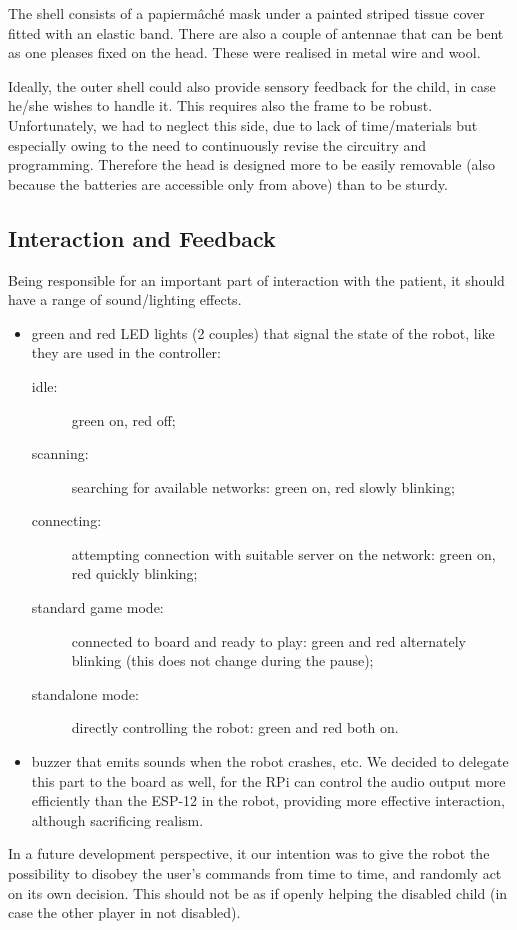 \documentclass[a4paper,twoside]{book}
\begin{document}
The shell consists of a papier\textendash m\^{a}ch\'{e} mask under a painted striped tissue cover fitted with an elastic band. There are also a couple of antennae that can be bent as one pleases fixed on the head. These were realised in metal wire and wool.

Ideally, the outer shell could also provide sensory feedback for the child, in case he/she wishes to handle it.
This requires also the frame to be robust. Unfortunately, we had to neglect this side, due to lack of time/materials but especially owing to the need to continuously revise the circuitry and programming. Therefore the head is designed more to be easily removable (also because the batteries are accessible only from above) than to be sturdy.

\subsection{Interaction and Feedback}

\beforelist* Being responsible for an important part of interaction with the patient, it should have a range of sound/lighting effects.
\begin{itemize}
\item green and red LED lights (2 couples) that signal the state of the robot, like they are used in the controller:
  \begin{description}
  \item[idle:] green on, red off;
  \item[scanning:] searching for available networks: green on, red slowly blinking;
  \item[connecting:] attempting connection with suitable server on the network: green on, red quickly blinking;
  \item[standard game mode:] connected to board and ready to play: green and red alternately blinking (this does not change during the pause);
  \item[standalone mode:] directly controlling the robot: green and red both on.
  \end{description}
\item buzzer that emits sounds when the robot crashes, etc. We decided to delegate this part to the board as well, for the RPi can control the audio output more efficiently than the ESP-12 in the robot, providing more effective interaction, although sacrificing realism.
\end{itemize}
\afterlist*
In a future development perspective, it our intention was to give the robot the possibility to disobey the user's commands from time to time, and randomly act on its own decision. This should not be as if openly helping the disabled child (in case the other player in not disabled).
\end{document}
